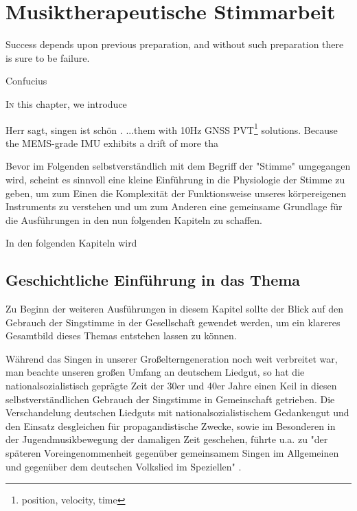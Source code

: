 
\chapter{Musiktherapeutische Stimmarbeit}
\label{chapter:musiktherapeutische_stimmarbeit}
\setlength{\epigraphwidth}{8.0cm}
\epigraph{Success depends upon previous preparation, and without such preparation there is sure to be failure.}{Confucius}
\ifpdf
    \graphicspath{{3_musiktherapeutische_stimmarbeit/figures/PNG/}{3_musiktherapeutische_stimmarbeit/figures/PDF/}{3_musiktherapeutische_stimmarbeit/figures/}}
\else
    \graphicspath{{3_musiktherapeutische_stimmarbeit/figures/EPS/}{3_musiktherapeutische_stimmarbeit/figures/}}
\fi
\lettrine{I}{n} this chapter, we introduce 


Herr \autocite[vgl.][12]{wolf2012} sagt, singen ist schön \autocite[9]{wolf2012}.
...them with 10Hz GNSS PVT\footnote{position, velocity, time} solutions. Because the MEMS-grade IMU exhibits a drift of more tha

Bevor im Folgenden selbstverständlich mit dem Begriff der "Stimme" umgegangen wird, scheint es sinnvoll eine kleine Einführung in die Physiologie der Stimme zu geben, um zum Einen die Komplexität der Funktionsweise unseres körpereigenen Instruments zu verstehen und um zum Anderen eine gemeinsame Grundlage für die Ausführungen in den nun folgenden Kapiteln zu schaffen.

In den folgenden Kapiteln wird 

\section{Geschichtliche Einführung in das Thema}
Zu Beginn der weiteren Ausführungen in diesem Kapitel sollte der Blick auf den Gebrauch der Singstimme in der Gesellschaft gewendet werden, um ein klareres Gesamtbild dieses Themas entstehen lassen zu können.

Während das Singen in unserer Großelterngeneration noch weit verbreitet war, man beachte unseren großen Umfang an deutschem Liedgut, so hat die nationalsozialistisch geprägte Zeit der 30er und 40er Jahre einen Keil in diesen selbstverständlichen Gebrauch der Singstimme in Gemeinschaft getrieben.
Die Verschandelung deutschen Liedguts mit nationalsozialistischem Gedankengut und den Einsatz desgleichen für propagandistische Zwecke, sowie im Besonderen in der Jugendmusikbewegung der damaligen Zeit geschehen, führte u.a. zu "der späteren Voreingenommenheit gegenüber gemeinsamem Singen im Allgemeinen und gegenüber dem deutschen Volkslied im Speziellen" \autocite[9]{wolf2012}.

